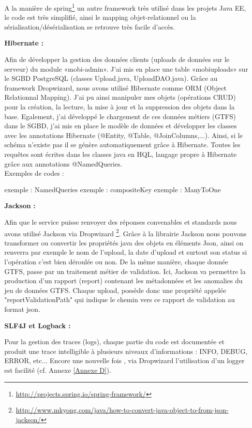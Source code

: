 \begin{itemize}
A la manière de spring\footnote{\url{http://projects.spring.io/spring-framework/}} un autre framework très utilisé dans les projets Java EE, le code est très simplifié, ainsi le mapping objet-relationnel ou la sérialisation/désérialisation se retrouve très facile d'accès.

\textbf{Hibernate :}

Afin de développer la gestion des données clients (uploads de données sur le serveur) du module «mobi-admin». J'ai mis en place une table «mobiuploads» sur le SGBD PostgreSQL (classes Upload.java, UploadDAO.java).
Grâce au framework Dropwizard, nous avons utilisé Hibernate comme ORM (Object Relationnal Mapping). J'ai pu ainsi manipuler mes objets (opérations CRUD) pour la création, la lecture, la mise à jour et la suppression des objets dans la base. 
Egalement, j'ai développé le chargement de ces données métiers (GTFS) dans le SGBD, j'ai mis en place le modèle de données et développer les classes avec les annotations Hibernate (@Entity, @Table, @JoinColumns,...). Ainsi, si le schéma n'existe pas il se génère automatiquement grâce à Hibernate. 
Toutes les requêtes sont écrites dans les classes java en HQL, langage propre à Hibernate grâce aux annotations @NamedQueries. \\

Exemples de codes : 

exemple : NamedQueries
exemple : compositeKey
exemple : ManyToOne


\textbf{Jackson :}

Afin que le service puisse renvoyer des réponses convenables et standards nous avons utilisé Jackson via Dropwizard \footnote{\url{http://www.mkyong.com/java/how-to-convert-java-object-to-from-json-jackson/}}. Grâce à la librairie Jackson nous pouvons transformer ou convertir les propriétés java des objets en éléments Json, ainsi on renverra par exemple le nom de l'upload, la date d'upload et surtout son status si l'opération c'est bien déroulée ou non.
De la même manière, chaque donnée GTFS, passe par un traitement métier de validation. Ici, Jackson va permettre la production d'un rapport (report) contenant les métadonnées et les anomalies du jeu de données GTFS.
Chaque upload, possède donc une propriété appelée "reportValidationPath" qui indique le chemin vers ce rapport de validation au format json.

\textbf{SLF4J et Logback :} 

Pour la gestion des traces (logs), chaque partie du code est documentée et produit une trace intelligible à plusieurs niveaux d'informations : INFO, DEBUG, ERROR, etc... Encore une nouvelle fois , via Dropwizard l'utilisation d'un logger est facilité (cf. Annexe \ref{Annexe D}).



\end{itemize}
